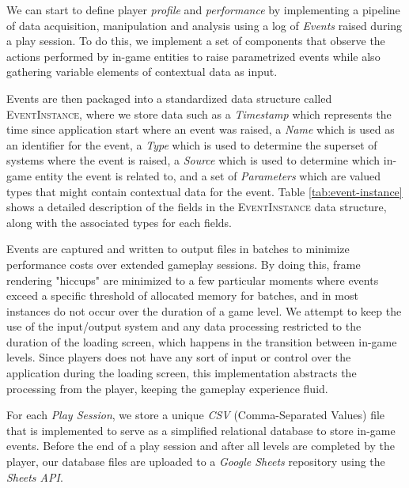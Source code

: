 

We can start to define player \emph{profile} and \emph{performance} by implementing a pipeline of data acquisition, manipulation and analysis using a log of \emph{Events} raised during a play session. To do this, we implement a set of components that observe the actions performed by in-game entities to raise parametrized events while also gathering variable elements of contextual data as input.

Events are then packaged into a standardized data structure called \textsc{EventInstance}, where we store data such as a \emph{Timestamp} which represents the time since application start where an event was raised, a \emph{Name} which is used as an identifier for the event, a \emph{Type} which is used to determine the superset of systems where the event is raised, a \emph{Source} which is used to determine which in-game entity the event is related to, and a set of \emph{Parameters} which are valued types that might contain contextual data for the event. Table \ref{tab:event-instance} shows a detailed description of the fields in the \textsc{EventInstance} data structure, along with the associated types for each fields.



Events are captured and written to output files in batches to minimize performance costs over extended gameplay sessions. By doing this, frame rendering "hiccups" are minimized to a few particular moments where events exceed a specific threshold of allocated memory for batches, and in most instances do not occur over the duration of a game level. We attempt to keep the use of the input/output system and any data processing restricted to the duration of the loading screen, which happens in the transition between in-game levels. Since players does not have any sort of input or control over the application during the loading screen, this implementation abstracts the processing from the player, keeping the gameplay experience fluid.


For each \emph{Play Session}, we store a unique \emph{CSV} (Comma-Separated Values) file that is implemented to serve as a simplified relational database to store in-game events. Before the end of a play session and after all levels are completed by the player, our database files are uploaded to a \emph{Google Sheets} repository using the \emph{Sheets API}.

